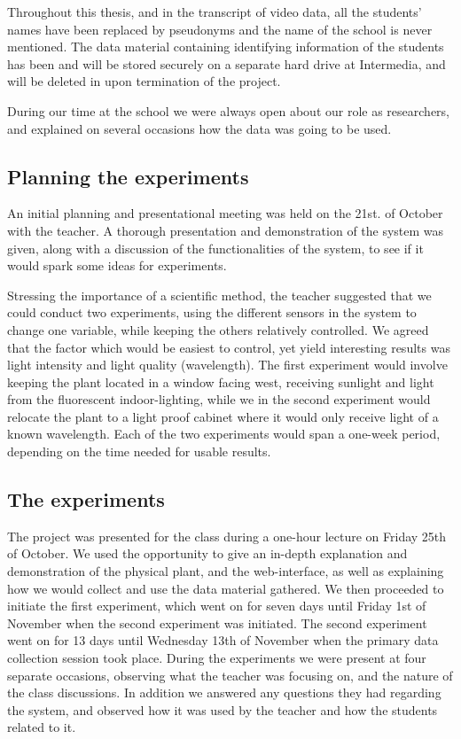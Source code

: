 Throughout this thesis, and in the transcript of video data, all the students' names have been replaced by pseudonyms and the name of the school is never mentioned. The data material containing identifying information of the students has been and will be stored securely on a separate hard drive at Intermedia, and will be deleted in upon termination of the project. 

During our time at the school we were always open about our role as researchers, and explained on several occasions how the data was going to be used. 

\subsection{Planning the experiments}
An initial planning and presentational meeting was held on the 21st. of October with the teacher. A thorough presentation and demonstration of the system was given, along with a discussion of the functionalities of the system, to see if it would spark some ideas for experiments. 

Stressing the importance of a scientific method, the teacher suggested that we could conduct two experiments, using the different sensors in the system to change one variable, while keeping the others relatively controlled. We agreed that the factor which would be easiest to control, yet yield interesting results was light intensity and light quality (wavelength). The first experiment would involve keeping the plant located in a window facing west, receiving sunlight and light from the fluorescent indoor-lighting, while we in the second experiment would relocate the plant to a light proof cabinet where it would only receive light of a known wavelength. Each of the two experiments would span a one-week period, depending on the time needed for usable results.

\subsection{The experiments}
The project was presented for the class during a one-hour lecture on Friday 25th of October. We used the opportunity to give an in-depth explanation and demonstration of the physical plant, and the web-interface, as well as explaining how we would collect and use the data material gathered. We then proceeded to initiate the first experiment, which went on for seven days until Friday 1st of November when the second experiment was initiated. The second experiment went on for 13 days until Wednesday 13th of November when the primary data collection session took place. During the experiments we were present at four separate occasions, observing what the teacher was focusing on, and the nature of the class discussions. In addition we answered any questions they had regarding the system, and observed how it was used by the teacher and how the students related to it. 

